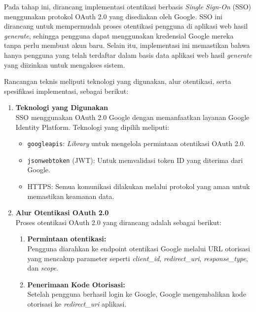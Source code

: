 Pada tahap ini, dirancang implementasi otentikasi berbasis \textit{Single Sign-On} (SSO) menggunakan protokol OAuth 2.0 yang disediakan oleh Google. SSO ini dirancang untuk mempermudah proses otentikasi pengguna di aplikasi web hasil \textit{generate}, sehingga pengguna dapat menggunakan kredensial Google mereka tanpa perlu membuat akun baru. Selain itu, implementasi ini memastikan bahwa hanya pengguna yang telah terdaftar dalam basis data aplikasi web hasil \textit{generate} yang diizinkan untuk mengakses sistem.

Rancangan teknis meliputi teknologi yang digunakan, alur otentikasi, serta spesifikasi implementasi, sebagai berikut:

\begin{enumerate}[label*=\arabic*.,ref=\arabic*]

    \item \textbf{Teknologi yang Digunakan}\\
    SSO menggunakan OAuth 2.0 Google dengan memanfaatkan layanan Google Identity Platform. Teknologi yang dipilih meliputi:
    \begin{itemize}
        \item \texttt{googleapis}: \textit{Library} untuk mengelola permintaan otentikasi OAuth 2.0.
        \item \texttt{jsonwebtoken} (JWT): Untuk memvalidasi token ID yang diterima dari Google.
        \item HTTPS: Semua komunikasi dilakukan melalui protokol yang aman untuk memastikan keamanan data.
    \end{itemize}

    \item \textbf{Alur Otentikasi OAuth 2.0}\\
    Proses otentikasi OAuth 2.0 yang dirancang adalah sebagai berikut:
    \begin{enumerate}[label=\alph*.]
        \item \textbf{Permintaan otentikasi:}\\
        Pengguna diarahkan ke endpoint otentikasi Google melalui URL otorisasi yang mencakup parameter seperti \textit{client\_id}, \textit{redirect\_uri}, \textit{response\_type}, dan \textit{scope}.
        
        \item \textbf{Penerimaan Kode Otorisasi:}\\
        Setelah pengguna berhasil login ke Google, Google mengembalikan kode otorisasi ke \textit{redirect\_uri} aplikasi.


\end{enumerate}
\end{enumerate}
